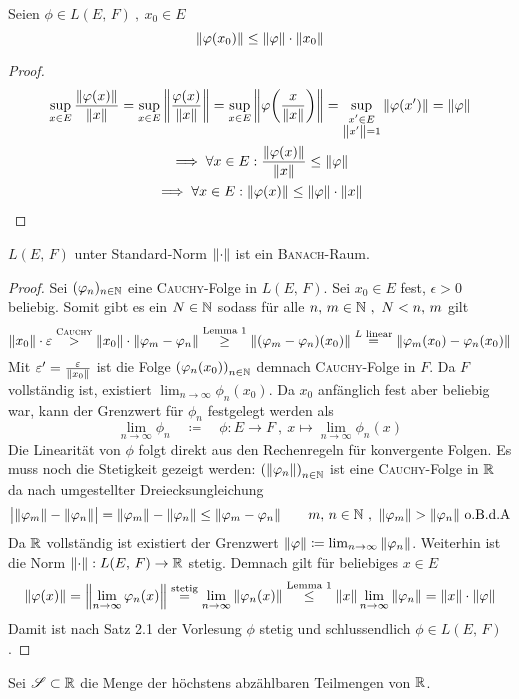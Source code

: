 \documentclass{anablatt}
\begin{document}
\begin{lemma}
Seien $\phi \in L(E,\,F) ~,~ x_0 \in E$
\[ \norm{\varphi(x_0)} \leq \norm{\varphi}\cdot\norm{x_0} \]
\end{lemma}
\begin{proof}
\begin{gather*}
    \sup_{x \in E} \frac{\norm{\varphi(x)}}{\norm{x}}
    = \sup_{x \in E} \norm{\frac{\varphi(x)}{\norm{x}}}
    = \sup_{x \in E} \norm{\varphi\qty(\frac{x}{\norm{x}})}
    = \sup_{\substack{x' \in E\\\norm{x'}=1}} \norm{\varphi(x')}
    = \norm{\varphi}
    \\
    \implies \forall x \in E : \frac{\norm{\varphi(x)}}{\norm{x}} \leq \norm{\varphi} \\
    \implies \forall x \in E : \norm{\varphi(x)} \leq \norm{\varphi} \cdot \norm{x}
\end{gather*}
\end{proof}
\newpage
\begin{theorem}
    $L(E,\, F)$ unter Standard-Norm $\norm{\cdot}$ ist ein \textsc{Banach}-Raum.
\end{theorem}
\begin{proof}
Sei $(\varphi_n)_{n \in \mathbb{N}}$ eine \textsc{Cauchy}-Folge in $L(E,\, F)$. Sei $x_0 \in E$ fest, $\epsilon > 0$ beliebig. Somit gibt es ein $N \in \mathbb{N}$ sodass für alle $n,\, m \in \mathbb{N} ~,~ N < n,\, m$ gilt
\[
    \norm{x_0}\cdot\varepsilon
    \stackrel{\textsc{Cauchy}}> \norm{x_0}\cdot\norm{\varphi_m-\varphi_n} 
    \stackrel{\text{Lemma 1}}\geq \norm{(\varphi_m-\varphi_n)(x_0)}
    \stackrel{L \text{ linear}}= \norm{\varphi_m(x_0) - \varphi_n(x_0)}
\]
Mit $\varepsilon' = \frac{\varepsilon}{\norm{x_0}}$ ist die Folge $\qty(\varphi_n(x_0))_{n \in \mathbb{N}}$ demnach \textsc{Cauchy}-Folge in $F$. Da $F$ vollständig ist, existiert $\lim_{n \rightarrow \infty} \phi_n(x_0)$. Da $x_0$ anfänglich fest aber beliebig war, kann der Grenzwert für $\phi_n$ festgelegt werden als
\[ \lim_{n \rightarrow \infty}\phi_n \quad\coloneqq\quad \phi : E \rightarrow F ~,~ x \mapsto \lim_{n \rightarrow \infty} \phi_n(x) \]
Die Linearität von $\phi$ folgt direkt aus den Rechenregeln für konvergente Folgen. Es muss noch die Stetigkeit gezeigt werden: $\qty(\norm{\varphi_n})_{n \in \mathbb{N}}$ ist eine \textsc{Cauchy}-Folge in $\mathbb{R}$ da nach umgestellter Dreiecksungleichung
\[ \abs\big{\norm{\varphi_m} - \norm{\varphi_n}} = \norm{\varphi_m} - \norm{\varphi_n} \leq \norm{\varphi_m - \varphi_n} \qquad m,\, n \in \mathbb{N} ~,~ \norm{\varphi_m} > \norm{\varphi_n} \text{ o.B.d.A}\]
Da $\mathbb{R}$ vollständig ist existiert der Grenzwert $\norm{\varphi} \coloneqq \lim_{n \rightarrow \infty} \norm{\varphi_n}$. Weiterhin ist die Norm $\norm{\cdot} : L(E,\, F) \rightarrow \mathbb{R}$ stetig. Demnach gilt für beliebiges $x \in E$
\[
    \norm{\varphi(x)} = \norm{\lim_{n\rightarrow\infty}\varphi_n(x)}
    \stackrel{\text{stetig}}= \lim_{n\rightarrow\infty}\norm{\varphi_n(x)} 
    \stackrel{\text{Lemma 1}}\leq \norm{x}\lim_{n\rightarrow\infty}\norm{\varphi_n}
    = \norm{x}\cdot\norm{\varphi}
\]
Damit ist nach Satz 2.1 der Vorlesung $\phi$ stetig und schlussendlich $\phi \in L(E,\, F)$.
\end{proof}
\task Sei $\mathscr{S} \subset \mathbb{R}$ die Menge der höchstens abzählbaren Teilmengen von $\mathbb{R}$.
\end{document}
